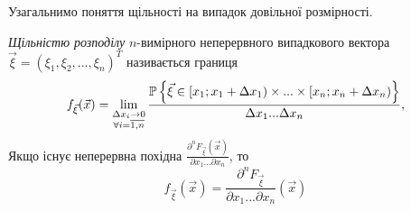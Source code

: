 Узагальнимо поняття щільності на випадок довільної розмірності.
\begin{samepage}
    \begin{definition}
        \emph{Щільністю розподілу} $n$-вимірного неперервного випадкового 
        вектора $\vec{\xi} = \left(\xi_1, \xi_2, ..., \xi_n\right)^T$ називається границя
        \begin{equation}
            f_{\vec{\xi}} (\vec{x}) = \lim_{\substack{\Delta x_i \to 0 \\
            \forall i = \overline{1,n}}} 
            \frac{\P\left\{\vec{\xi} \in 
            \left[x_1; x_1+\Delta x_1\right) \times ... \times 
            \left[x_n; x_n+\Delta x_n\right)\right\}}{\Delta x_1...\Delta x_n},
        \end{equation}
        Якщо існує неперервна похідна $\frac{\partial^n F_{\vec{\xi}}(\vec{x})}
        {\partial x_1 ... \partial x_n}$, то
        \begin{equation}\label{eq:dens_rn}
            f_{\vec{\xi}} (\vec{x}) = \frac{\partial^n F_{\vec{\xi}}}
            {\partial x_1 ... \partial x_n}(\vec{x})
        \end{equation}
    \end{definition}
\end{samepage}

